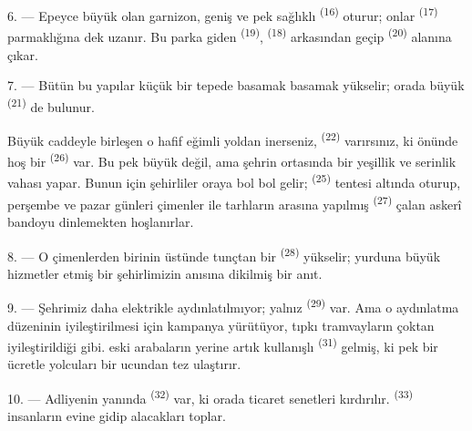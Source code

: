 \VUsaut{5.0mm}
\VUsaut{3.4mm}

6. --- Epeyce büyük olan garnizon, geniş ve pek sağlıklı 
\textsuperscript{(16)} oturur; onlar 
\textsuperscript{(17)} parmaklığına dek uzanır. Bu parka giden
 \textsuperscript{(19)}, 
\textsuperscript{(18)} arkasından geçip 
\textsuperscript{(20)} alanına çıkar.

7. --- Bütün bu yapılar küçük bir tepede basamak basamak yükselir; orada büyük
 \textsuperscript{(21)} de bulunur.

Büyük caddeyle birleşen o hafif eğimli yoldan inerseniz, 
\textsuperscript{(22)} varırsınız, ki önünde hoş bir 
\textsuperscript{(26)} var. Bu  pek büyük değil, ama şehrin
ortasında bir yeşillik ve serinlik vahası yapar. Bunun için şehirliler oraya
bol bol gelir;  \textsuperscript{(25)} tentesi altında
oturup, perşembe ve pazar günleri çimenler ile tarhların arasına yapılmış
 \textsuperscript{(27)} çalan askerî bandoyu dinlemekten
hoşlanırlar.

8. --- O çimenlerden birinin üstünde tunçtan bir 
\textsuperscript{(28)} yükselir; yurduna büyük hizmetler etmiş bir
şehirlimizin anısına dikilmiş bir anıt.

\VUsaut{4.0mm}
\VUsaut{3.4mm}

9. --- Şehrimiz daha elektrikle aydınlatılmıyor; yalnız  \textsuperscript{(29)} var. Ama  o
aydınlatma düzeninin iyileştirilmesi için kampanya yürütüyor, tıpkı
tramvayların  çoktan iyileştirildiği gibi.
  eski arabaların yerine artık kullanışlı
 \textsuperscript{(31)} gelmiş, ki pek
 bir ücretle yolcuları  bir ucundan
 tez ulaştırır.

10. --- Adliyenin yanında  \textsuperscript{(32)} var, ki
orada ticaret senetleri kırdırılır. 
\textsuperscript{(33)} insanların evine gidip alacakları toplar.

\VUsaut{4.0mm}
\VUsaut{3.4mm}

